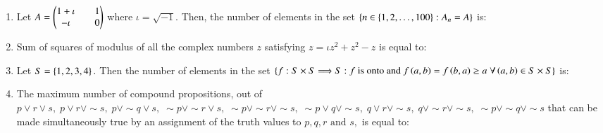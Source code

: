 \documentclass[journal]{IEEEtran}
\theoremstyle{remark}
\begin{document}
\begin{enumerate}
\item  Let $A = \begin{pmatrix}1+\iota && 1\\-\iota &&0\end{pmatrix} $ where $\iota=\sqrt{-1}.$ Then, the number of elements in the set $ \left\{n \in \{1, 2, \ldots, 100\} : A_n = A\right\} $  is:\\

\item Sum of squares of modulus of all the complex numbers $z$ satisfying ${z} = \iota z^2 + z^2 - z$ is equal to:\\

\item Let $S = \left\{1, 2, 3, 4\right\}.$ Then the number of elements in the set $\left\{f : S \times S \Longrightarrow S : f \text{ is onto and }f\left(a,b\right)=f\left(b,a\right) \geq a \; \forall \left(a,b\right) \in  S \times S\right\}$ is:\\

\item  The maximum number of compound propositions, out of $p \lor r \lor s, \; p \lor r \lor \sim s, \; p \lor \sim q \lor s, \; \sim p \lor \sim r \lor s, \; \sim p \lor \sim r \lor \sim s, \; \sim p \lor q \lor \sim s, \; q \lor r \lor \sim s, \; q \lor \sim r \lor \sim s, \; \sim p \lor \sim q \lor \sim s$ that can be made simultaneously true by an assignment of the truth values to $p, q, r \text{ and } s,$ is equal to:


\end{enumerate}
\end{document}

